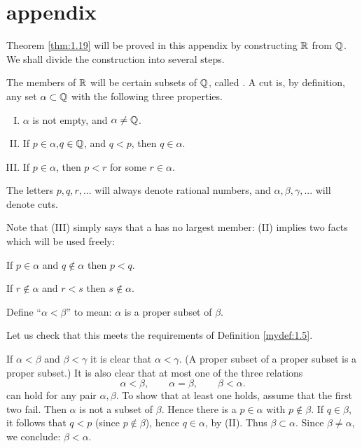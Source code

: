 \section*{appendix}
\label{chap01_app}
Theorem \ref{thm:1.19} will be proved in this appendix
by constructing ${\protect\mathbb R}$ from ${\protect\mathbb Q}$.
We shall divide the construction into several steps.

\label{chap01_app_Step:1}
The members of ${\protect\mathbb R}$ will be certain subsets of ${\protect\mathbb Q}$, called .
A cut is, by definition,
any set $\alpha \subset {\protect\mathbb Q}$ with the following three properties.
\begin{enumerate}[(I)]
    \item $\alpha$ is not empty, and $\alpha \neq {\protect\mathbb Q}$.
    \item If $p\in \alpha$,$q \in {\protect\mathbb Q}$, and $q <p$, then $q \in \alpha$.
    \item If $p \in \alpha$, then $p <r$ for some $r\in \alpha$.
\end{enumerate}

The letters $p, q, r, ...$ will always denote rational numbers,
and $\alpha, \beta, \gamma, ...$ will denote cuts.

Note that (III) simply says that a has no largest member:
(II) implies two facts which will be used freely:

If $p\in\alpha$ and $q\not\in\alpha$ then $p<q$.

If $r\not\in \alpha$ and $r<s$ then $s\not\in \alpha$.

\label{chap01_app_Step:2}
Define ``$\alpha < \beta$'' to mean:
$\alpha$ is a proper subset of $\beta$.

Let us check that this meets the requirements of Definition \ref{mydef:1.5}.

If $\alpha < \beta$ and $\beta < \gamma$ it is clear that $\alpha < \gamma$.
(A proper subset of a proper subset is a proper subset.)
It is also clear that at most one of the three relations
\begin{equation*}
    \alpha < \beta, \qquad
    \alpha = \beta, \qquad
    \beta < \alpha.
\end{equation*}
can hold for any pair $\alpha, \beta$.
To show that at least one holds, assume that the first two fail.
Then $\alpha$ is not a subset of $\beta$.
Hence there is a $p \in \alpha$ with $p \not\in \beta$.
If $q \in \beta$, it follows that $q <p$ (since $p \not\in \beta$),
hence $q \in \alpha$, by (II).
Thus $\beta \subset \alpha$.
Since $\beta \neq \alpha$, we conclude: $\beta < \alpha$.

